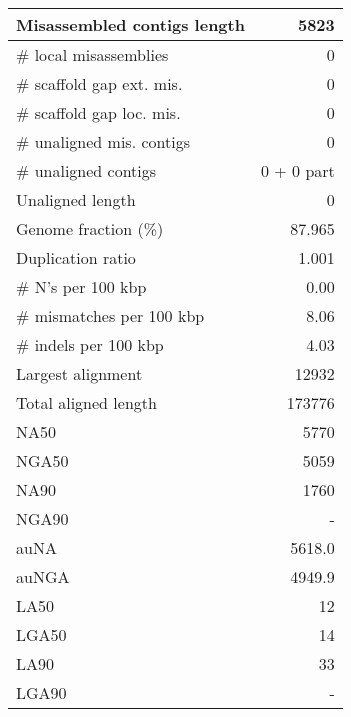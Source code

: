 \documentclass[12pt,a4paper]{article}
\begin{document}
\begin{table}[ht]
\begin{center}
\begin{tabular}{|l*{1}{|r}|}
Misassembled contigs length & 5823 \\ \hline
\# local misassemblies & 0 \\ \hline
\# scaffold gap ext. mis. & 0 \\ \hline
\# scaffold gap loc. mis. & 0 \\ \hline
\# unaligned mis. contigs & 0 \\ \hline
\# unaligned contigs & 0 + 0 part \\ \hline
Unaligned length & 0 \\ \hline
Genome fraction (\%) & 87.965 \\ \hline
Duplication ratio & 1.001 \\ \hline
\# N's per 100 kbp & 0.00 \\ \hline
\# mismatches per 100 kbp & 8.06 \\ \hline
\# indels per 100 kbp & 4.03 \\ \hline
Largest alignment & 12932 \\ \hline
Total aligned length & 173776 \\ \hline
NA50 & 5770 \\ \hline
NGA50 & 5059 \\ \hline
NA90 & 1760 \\ \hline
NGA90 & - \\ \hline
auNA & 5618.0 \\ \hline
auNGA & 4949.9 \\ \hline
LA50 & 12 \\ \hline
LGA50 & 14 \\ \hline
LA90 & 33 \\ \hline
LGA90 & - \\ \hline
\end{tabular}
\end{center}
\end{table}
\end{document}
